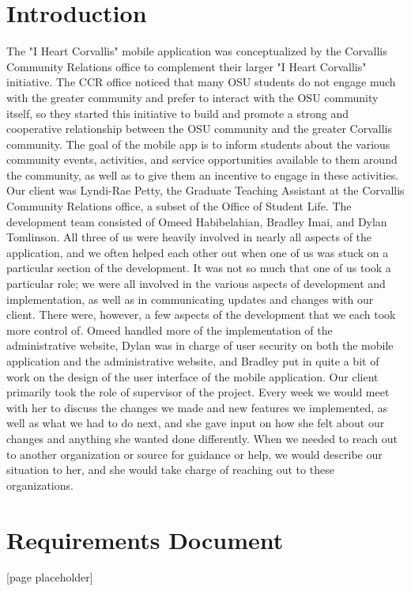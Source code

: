 \documentclass[onecolumn, draftclsnofoot,10pt, compsoc]{IEEEtran}
\begin{document}
\section{Introduction}
  The "I Heart Corvallis" mobile application was conceptualized by the Corvallis Community Relations office to complement their larger "I Heart Corvallis" initiative. The CCR office noticed that many OSU students do not engage much with the greater community and prefer to interact with the OSU community itself, so they started this initiative to build and promote a strong and cooperative relationship between the OSU community and the greater Corvallis community. The goal of the mobile app is to inform students about the various community events, activities, and service opportunities available to them around the community, as well as to give them an incentive to engage in these activities.
  Our client was Lyndi-Rae Petty, the Graduate Teaching Assistant at the Corvallis Community Relations office, a subset of the Office of Student Life. The development team consisted of Omeed Habibelahian, Bradley Imai, and Dylan Tomlinson. All three of us were heavily involved in nearly all aspects of the application, and we often helped each other out when one of us was stuck on a particular section of the development. It was not so much that one of us took a particular role; we were all involved in the various aspects of development and implementation, as well as in communicating updates and changes with our client. There were, however, a few aspects of the development that we each took more control of. Omeed handled more of the implementation of the administrative website, Dylan was in charge of user security on both the mobile application and the administrative website, and Bradley put in quite a bit of work on the design of the user interface of the mobile application.
  Our client primarily took the role of supervisor of the project. Every week we would meet with her to discuss the changes we made and new features we implemented, as well as what we had to do next, and she gave input on how she felt about our changes and anything she wanted done differently. When we needed to reach out to another organization or source for guidance or help, we would describe our situation to her, and she would take charge of reaching out to these organizations.
  \newpage

\section{Requirements Document}
  [page placeholder]\newpage
\end{document}
